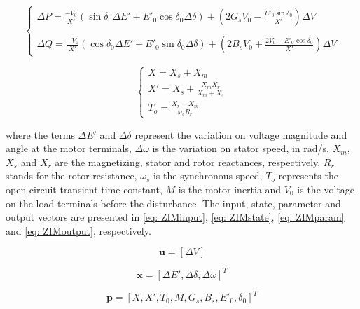 \begin{apendicesenv}
\begin{equation}
    \begin{cases}
        \Delta P = \frac{-V_{0}}{X'}(\sin{\delta_{0}}\Delta E' + E'_{0}\cos{\delta_{0}}\Delta \delta) + \left(2G_{s} V_{0} - \frac{E'_{0} \sin{\delta_{0}}}{X'}\right)\Delta V \\
        \\
        \Delta Q = \frac{-V_{0}}{X'}(\cos{\delta_{0}}\Delta E' + E'_{0}\sin{\delta_{0}}\Delta\delta) + \left(2B_{s} V_{0} + \frac{2V_{0} - E'_{0} \cos{\delta_{0}}}{X'}\right)\Delta V
    \end{cases}
    \label{eq: yZIM}
\end{equation}

\begin{equation}
    \begin{cases}
    X = X_{s} + X_{m} \\
    X' = X_{s} + \frac{X_{m} X_{r}}{X_{m} + X_{s}} \\
    T_{o} = \frac{X_{r} + X_{m}}{\omega_{s} R_{r}}
    \end{cases}
    \label{eq: terms}
\end{equation}

\noindent where the terms $\Delta E'$ and $\Delta \delta$ represent the variation on voltage magnitude and angle at the motor terminals, $\Delta \omega$ is the variation on stator speed, in rad/s. $X_m$, $X_s$ and $X_r$ are the magnetizing, stator and rotor reactances, respectively, $R_r$ stands for the rotor resistance, $\omega_{s}$ is the synchronous speed, $T_o$ represents the open-circuit transient time constant, $M$ is the motor inertia and $V_{0}$ is the voltage on the load terminals before the disturbance. The input, state, parameter and output vectors are presented in \eqref{eq: ZIMinput}, \eqref{eq: ZIMstate}, \eqref{eq: ZIMparam} and \eqref{eq: ZIMoutput}, respectively.

\begin{equation}
	\mathbf{u} = [\Delta V]
	\label{eq: ZIMinput}
\end{equation}

\begin{equation}
	\mathbf{x} = [\Delta E', \Delta \delta, \Delta \omega]^{T}
	\label{eq: ZIMstate}
\end{equation}

\begin{equation}
	\mathbf{p} = [X, X', T_{0}, M, G_{s}, B_{s}, E'_{0}, \delta_{0}]^{T}
	\label{eq: ZIMparam}
\end{equation}


\end{apendicesenv}
